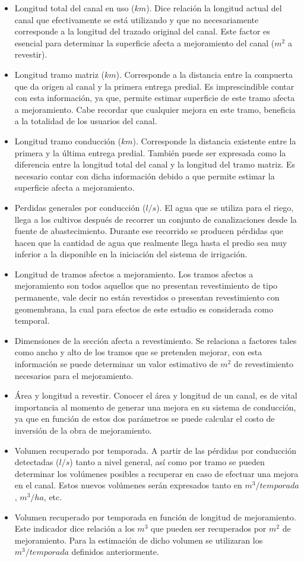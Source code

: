 \documentclass[]{article}
\begin{document}
\begin{itemize}
\item Longitud total del canal en uso ($km$). Dice relación la longitud actual del canal que efectivamente se está utilizando y que no necesariamente corresponde a la longitud del trazado original del canal. Este factor es esencial para determinar la superficie afecta a mejoramiento del canal ($m^2$ a revestir).
\item Longitud tramo matriz ($km$). Corresponde a la distancia entre la compuerta que da origen al canal y la primera entrega predial. Es imprescindible contar con esta información, ya que, permite estimar superficie de este tramo afecta a mejoramiento. Cabe recordar que cualquier mejora en este tramo, beneficia a la totalidad de los usuarios del canal.
\item Longitud tramo conducción ($km$). Corresponde la distancia existente entre la primera y la última entrega predial. También puede ser expresada como la diferencia entre la longitud total del canal y la longitud del tramo matriz. Es necesario contar con dicha información debido a que permite estimar la superficie afecta a mejoramiento.
\item Perdidas generales por conducción ($l/s$). El agua que se utiliza para el riego, llega a los cultivos después de recorrer un conjunto de canalizaciones desde la fuente de abastecimiento. Durante ese recorrido se producen pérdidas que hacen que la cantidad de agua que realmente llega hasta el predio sea muy inferior a la disponible en la iniciación del sistema de irrigación.
\item Longitud de tramos afectos a mejoramiento. Los tramos afectos a mejoramiento son todos aquellos que no presentan revestimiento de tipo permanente, vale decir no están revestidos o presentan revestimiento con geomembrana, la cual para efectos de este estudio es considerada como temporal.
\item Dimensiones de la sección afecta a revestimiento. Se relaciona a factores tales como ancho y alto de los tramos que se pretenden mejorar, con esta información se puede determinar un valor estimativo de $m^2$ de revestimiento necesarios para el mejoramiento.
\item Área y longitud a revestir. Conocer el área y longitud de un canal, es de vital importancia al momento de generar una mejora en su sistema de conducción, ya que en función de estos dos parámetros se puede calcular el costo de inversión de la obra de mejoramiento.
\item Volumen recuperado por temporada. A partir de las pérdidas por conducción detectadas ($l/s$) tanto a nivel general, así como por tramo se pueden determinar los volúmenes posibles a recuperar en caso de efectuar una mejora en el canal. Estos nuevos volúmenes serán expresados tanto en $m^3/temporada$, $m^3/ha$, etc.
\item Volumen recuperado por temporada en función de longitud de mejoramiento. Este indicador dice relación a los $m^3$ que pueden ser recuperados por $m^2$ de mejoramiento. Para la estimación de dicho volumen se utilizaran los $m^3/temporada$ definidos anteriormente.
\end{itemize}
\end{document}
